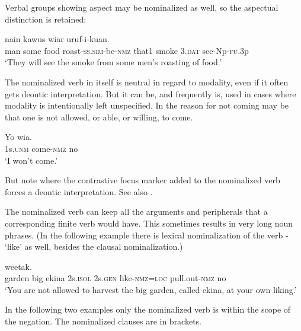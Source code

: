 Verbal groups showing aspect may be nominalized as well, so the aspectual distinction is retained: 

\ea%
\label{ex:5:x1841}
  nain  kawus  wiar uruf-i-kuan. \\
     man  some  food  roast-\textsc{ss}.\textsc{sim}-be-\textsc{nmz}  that1  smoke  3.\textsc{dat} see-Np-\textsc{fu}.3p \\
\glt `They will see the smoke from some men's roasting of food.'
\z

The nominalized verb in itself is neutral in regard to modality, even if it often gets deontic interpretation. But it can be, and frequently is, used in cases where modality is intentionally left unspecified. In  the reason for not coming may be that one is not allowed, or able, or willing, to come. 

\ea%
\label{ex:5:x1257}
\gll Yo    wia. \\
     1s.\textsc{unm}  come-\textsc{nmz}  no \\
\glt `I won't come.'
\z

But note  where the contrastive focus marker added to the nominalized verb forces a deontic interpretation. See also . 

The nominalized verb can keep all the arguments and peripherals that a corresponding finite verb would have. This sometimes results in very long noun phrases. (In the following example there is lexical nominalization of the verb - `like' as well, besides the clausal nominalization.)

\ea%
\label{ex:5:x1234}
\gll [\textstyleEmphasizedVernacularWords{Manin(a)} \textstyleEmphasizedVernacularWords{maneka}, \textstyleEmphasizedVernacularWords{ekina}, \textstyleEmphasizedVernacularWords{naisow} \textstyleEmphasizedVernacularWords{nena} \textstyleEmphasizedVernacularWords{kookal-owa}\textstyleEmphasizedVernacularWords{=pa} \textstyleEmphasizedVernacularWords{perek-owa}]  weetak. \\
     garden    big    ekina  2s.\textsc{isol}  2s.\textsc{gen} like-\textsc{nmz}=\textsc{loc}   pull.out-\textsc{nmz}  no \\
\glt `You are not allowed to harvest the big garden, called ekina, at your own liking.'
\z

In the following two examples only the nominalized verb is within the scope of the negation. The nominalized clauses are in brackets.

